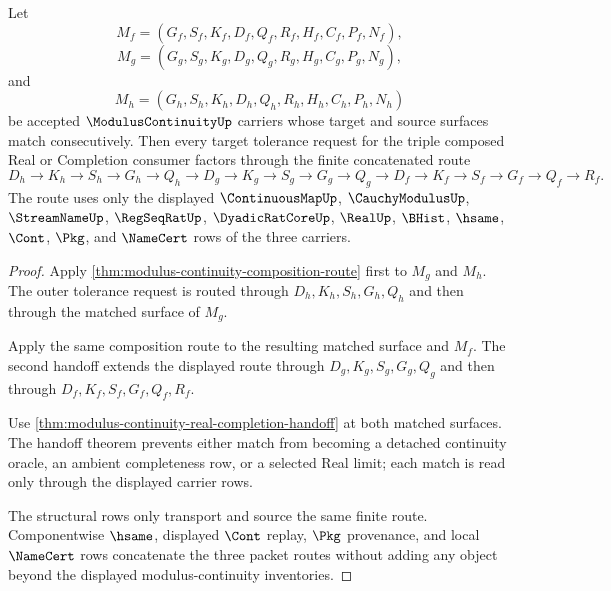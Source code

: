 \begin{theorem}
\label{thm:modulus-continuity-double-composition-route}
Let
$$
M_f=(G_f,S_f,K_f,D_f,Q_f,R_f,H_f,C_f,P_f,N_f),
$$
$$
M_g=(G_g,S_g,K_g,D_g,Q_g,R_g,H_g,C_g,P_g,N_g),
$$
and
$$
M_h=(G_h,S_h,K_h,D_h,Q_h,R_h,H_h,C_h,P_h,N_h)
$$
be accepted $\ModulusContinuityUp$ carriers whose target and source surfaces match consecutively. Then every target tolerance request for the triple composed Real or Completion consumer factors through the finite concatenated route
$$
D_h \to K_h \to S_h \to G_h \to Q_h \to
D_g \to K_g \to S_g \to G_g \to Q_g \to
D_f \to K_f \to S_f \to G_f \to Q_f \to R_f .
$$
The route uses only the displayed $\ContinuousMapUp$, $\CauchyModulusUp$, $\StreamNameUp$, $\RegSeqRatUp$, $\DyadicRatCoreUp$, $\RealUp$, $\BHist$, $\hsame$, $\Cont$, $\Pkg$, and $\NameCert$ rows of the three carriers.
\end{theorem}
\begin{proof}
Apply \autoref{thm:modulus-continuity-composition-route} first to $M_g$ and $M_h$. The outer tolerance request is routed through $D_h,K_h,S_h,G_h,Q_h$ and then through the matched surface of $M_g$.

Apply the same composition route to the resulting matched surface and $M_f$. The second handoff extends the displayed route through $D_g,K_g,S_g,G_g,Q_g$ and then through $D_f,K_f,S_f,G_f,Q_f,R_f$.

Use \autoref{thm:modulus-continuity-real-completion-handoff} at both matched surfaces. The handoff theorem prevents either match from becoming a detached continuity oracle, an ambient completeness row, or a selected Real limit; each match is read only through the displayed carrier rows.

The structural rows only transport and source the same finite route. Componentwise $\hsame$, displayed $\Cont$ replay, $\Pkg$ provenance, and local $\NameCert$ rows concatenate the three packet routes without adding any object beyond the displayed modulus-continuity inventories.
\end{proof}

